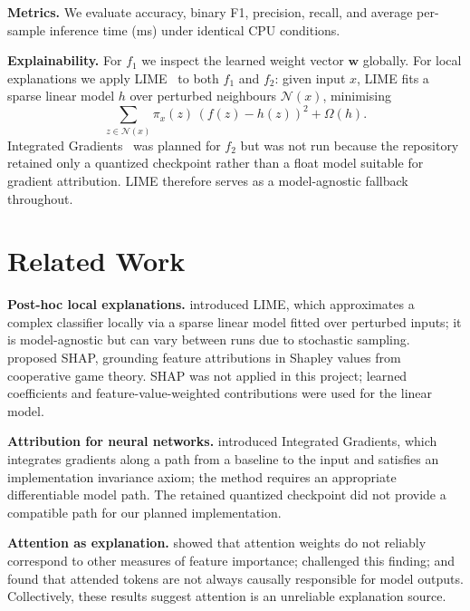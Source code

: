 \documentclass[10pt]{article}
\begin{document}
\textbf{Metrics.}  We evaluate accuracy, binary F1, precision, recall,
and average per-sample inference time (ms) under identical CPU conditions.

\textbf{Explainability.}  For $f_1$ we inspect the learned weight vector
$\mathbf{w}$ globally.  For local explanations we apply
LIME~\citep{ribeiro2016} to both $f_1$ and $f_2$: given input $x$, LIME fits a
sparse linear model $h$ over perturbed neighbours $\mathcal{N}(x)$, minimising
\[
  \sum_{z \in \mathcal{N}(x)} \pi_x(z)\,(f(z) - h(z))^2 + \Omega(h).
\]
Integrated Gradients~\citep{sundararajan2017} was planned for $f_2$ but was not
run because the repository retained only a quantized checkpoint rather than a
float model suitable for gradient attribution.  LIME therefore serves as a
model-agnostic fallback throughout.


\section{Related Work}

\textbf{Post-hoc local explanations.}  \citet{ribeiro2016} introduced LIME,
which approximates a complex classifier locally via a sparse linear model fitted
over perturbed inputs; it is model-agnostic but can vary between runs due to
stochastic sampling.  \citet{lundberg2017} proposed SHAP, grounding feature
attributions in Shapley values from cooperative game theory. SHAP was not
applied in this project; learned coefficients and feature-value-weighted
contributions were used for the linear model.

\textbf{Attribution for neural networks.}  \citet{sundararajan2017} introduced
Integrated Gradients, which integrates gradients along a path from a baseline
to the input and satisfies an implementation invariance axiom; the method
requires an appropriate differentiable model path. The retained quantized
checkpoint did not provide a compatible path for our planned implementation.

\textbf{Attention as explanation.}  \citet{jain2019} showed that attention
weights do not reliably correspond to other measures of feature importance;
\citet{wiegreffe2019} challenged this finding; and \citet{serrano2019} found
that attended tokens are not always causally responsible for model outputs.
Collectively, these results suggest attention is an unreliable explanation
source.
\end{document}
